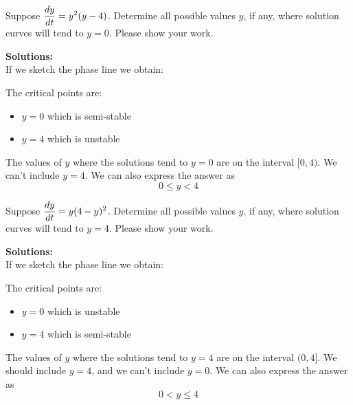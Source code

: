 \ifnum {}
\question[2] Suppose $\displaystyle {\frac{dy}{dt}} =y^2(y-4)$. Determine all possible values $y$, if any, where solution curves will tend to $y=0$. Please show your work. 

\ifnum {} {\color{DarkGreen} 
\textbf{Solutions:} \\
If we sketch the phase line we obtain:

\begin{center}
\end{center}

The critical points are:
\begin{itemize}
    \item $y=0$ which is semi-stable
    \item $y=4$ which is unstable
\end{itemize}
The values of $y$ where the solutions tend to $y=0$ are on the interval $[0,4)$. We can't include $y=4$. We can also express the answer as
$$0\le y < 4$$
} 
\else 
\vspace{6cm}
\fi\fi 



\ifnum {}
\question[2] Suppose $\displaystyle {\frac{dy}{dt}} = y(4-y)^2$. Determine all possible values $y$, if any, where solution curves will tend to $y=4$. Please show your work. 

\ifnum {} {\color{DarkGreen} 
\textbf{Solutions:} \\
If we sketch the phase line we obtain:

\begin{center}
\end{center}

The critical points are:
\begin{itemize}
    \item $y=0$ which is unstable
    \item $y=4$ which is semi-stable
\end{itemize}
The values of $y$ where the solutions tend to $y=4$ are on the interval $(0,4]$. We should include $y=4$, and we can't include $y=0$. We can also express the answer as
$$0 < y \le 4$$
} 
\else 
\vspace{6cm}
\fi\fi 



